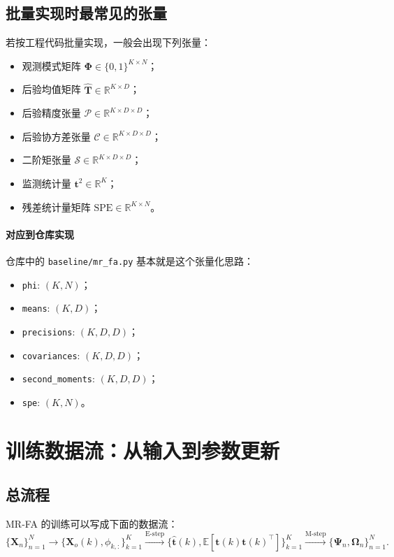 \documentclass[UTF8]{ctexart}
\begin{document}
\subsection{批量实现时最常见的张量}

若按工程代码批量实现，一般会出现下列张量：
\begin{itemize}
    \item 观测模式矩阵 $\bm{\Phi}\in\{0,1\}^{K\times N}$；
    \item 后验均值矩阵 $\hat{\bm{T}}\in\mathbb{R}^{K\times D}$；
    \item 后验精度张量 $\mathcal{P}\in\mathbb{R}^{K\times D\times D}$；
    \item 后验协方差张量 $\mathcal{C}\in\mathbb{R}^{K\times D\times D}$；
    \item 二阶矩张量 $\mathcal{S}\in\mathbb{R}^{K\times D\times D}$；
    \item 监测统计量 $\bm{t}^2\in\mathbb{R}^{K}$；
    \item 残差统计量矩阵 $\mathrm{SPE}\in\mathbb{R}^{K\times N}$。
\end{itemize}

\paragraph{对应到仓库实现}
仓库中的 \texttt{baseline/mr\_fa.py} 基本就是这个张量化思路：
\begin{itemize}
    \item \texttt{phi}: $(K,N)$；
    \item \texttt{means}: $(K,D)$；
    \item \texttt{precisions}: $(K,D,D)$；
    \item \texttt{covariances}: $(K,D,D)$；
    \item \texttt{second\_moments}: $(K,D,D)$；
    \item \texttt{spe}: $(K,N)$。
\end{itemize}

\section{训练数据流：从输入到参数更新}

\subsection{总流程}

MR-FA 的训练可以写成下面的数据流：
\begin{equation}
    \{\bm{X}_n\}_{n=1}^{N}
    \longrightarrow
    \{\bm{X}_o(k), \phi_{k,:}\}_{k=1}^{K}
    \xrightarrow{\text{E-step}}
    \{\hat{\bm{t}}(k), \mathbb{E}[\bm{t}(k)\bm{t}(k)^\top]\}_{k=1}^{K}
    \xrightarrow{\text{M-step}}
    \{\bm{\Psi}_n,\bm{\Omega}_n\}_{n=1}^{N}.
\end{equation}
\end{document}
